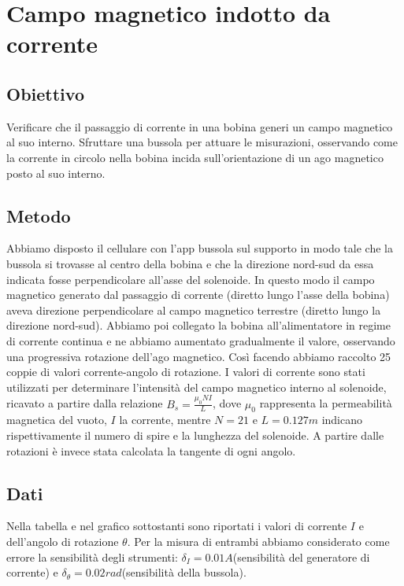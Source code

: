 \documentclass[a4paper]{article}
\begin{document}


\section{Campo magnetico indotto da corrente}
\subsection{Obiettivo}
Verificare che il passaggio di corrente in una bobina generi un campo magnetico al suo interno.
Sfruttare una bussola per attuare le misurazioni, osservando come la corrente in circolo nella bobina incida sull'orientazione di un ago magnetico posto al suo interno.
\subsection{Metodo}
Abbiamo disposto il cellulare con l’app bussola sul supporto in modo tale che la bussola si trovasse al centro della bobina e che la direzione nord-sud da essa indicata
fosse perpendicolare all'asse del solenoide. In questo modo il campo magnetico generato dal passaggio di corrente (diretto lungo l'asse della bobina) aveva direzione perpendicolare
al campo magnetico terrestre (diretto lungo la direzione nord-sud). Abbiamo poi collegato la bobina all’alimentatore in regime di corrente continua e ne abbiamo aumentato gradualmente il valore,
osservando una progressiva rotazione dell'ago magnetico. Così facendo abbiamo raccolto 25 coppie di valori corrente-angolo di rotazione.
I valori di corrente sono stati utilizzati per determinare l'intensità del campo magnetico interno al solenoide, ricavato a partire dalla relazione \( B_s = \frac {\mu_0NI}{L} \),
dove \(\mu_0\) rappresenta la permeabilità magnetica del vuoto, \( \mathit{I} \) la corrente,
mentre \( \mathit{N=21} \) e \( \mathit{L=0.127m} \) indicano rispettivamente il numero di spire e la lunghezza del solenoide.
A partire dalle rotazioni è invece stata calcolata la tangente di ogni angolo.
\subsection{Dati}
Nella tabella e nel grafico sottostanti sono riportati i valori di corrente \( \mathit{I} \) e dell'angolo di rotazione \(\theta\).
Per la misura di entrambi abbiamo considerato come errore la sensibilità degli strumenti:
\( \mathit{\delta_I=0.01A} \)(sensibilità del generatore di corrente) e \( \mathit{\delta_\theta=0.02rad} \)(sensibilità della bussola).
\end{document}
